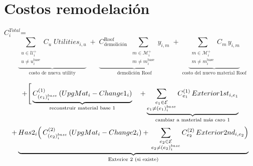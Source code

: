\section{Costos remodelación}
\label{sec:costos remodelación}
${C^{Total}_{i}}$= 
\[
\;\;
\underbrace{\sum_{\substack{u \in \mathcal{U}^+_i \\ u \neq u_i^{\text{base}}}} \! C_u \; Utilities_{i,u}}_{\text{costo de nueva utility}}
\;+\;
\underbrace{
C^{\text{Roof}}_{\text{demolición}}
\;\sum_{\substack{m \in \mathcal{M}^+_i \\ m \neq m_i^{\text{base}}}}
y_{i,m}
}_{\text{demolición Roof}}
\;+\;
\underbrace{\sum_{\substack{m \in \mathcal{M}^+_i \\ m \neq m_i^{\text{base}}}} C_m\, y_{i,m}}_{\text{costo del nuevo material Roof}}
\]

\[
+\Bigg[
\underbrace{C^{(1)}_{(e_1)^{base}_i}\, (UpgMat_i - Change1_i)}_{\text{reconstruir material base 1}}\\[4pt]
\quad
+\underbrace{\sum_{\substack{e_1\in\mathcal{E}\\ e_1\neq (e_1)^{base}_i}}
C^{(1)}_{e_1}\, Exterior1st_{i,e_1}}_{\text{cambiar a material más caro 1}}\\[6pt]
\]
\[
+\underbrace{Has2_i\Big(\,
C^{(2)}_{(e_2)^{base}_i}\, (UpgMat_i - Change2_i)
+\,
\sum_{\substack{e_2\in\mathcal{E}\\ e_2\neq (e_2)^{base}_i}}
C^{(2)}_{e_2}\, Exterior2nd_{i,e_2}
\Big)}_{\text{Exterior 2 (si existe)}}\\[6pt]
\]

